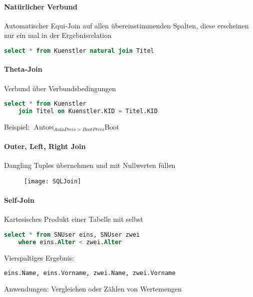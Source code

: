 \paragraph{Natürlicher Verbund}
\begin{items}
	\item Automatischer Equi-Join auf allen übereinstimmenden Spalten, diese erscheinen nur ein mal in der Ergebnisrelation
	\begin{lstlisting}[language=sql]
select * from Kuenstler natural join Titel
	\end{lstlisting}
\end{items}

\paragraph{Theta-Join}
\begin{items}
	\item Verbund über Verbundsbedingungen
	\begin{lstlisting}[language=sql]
select * from Kuenstler 
	join Titel on Kuenstler.KID = Titel.KID
	\end{lstlisting}
	\item Beispiel: \(  \text{Auto} \bowtie_{AutoPreis > BootPreis} \text{Boot} \)
\end{items}

\paragraph{Outer, Left, Right Join}
\begin{items}
	\item Dangling Tuples übernehmen und mit Nullwerten füllen
	\begin{figure}[H]\centering\label{SQLJoin}\texttt{[image: SQLJoin]}\end{figure}
\end{items}

\paragraph{Self-Join}
\begin{items}
	\item Kartesisches Produkt einer Tabelle mit selbst
	\begin{lstlisting}[language=sql] 
	select * from SNUser eins, SNUser zwei
	where eins.Alter < zwei.Alter
	\end{lstlisting}
	Vierspaltiges Ergebnis:
	\begin{lstlisting}[language=sql]
eins.Name, eins.Vorname, zwei.Name, zwei.Vorname
	\end{lstlisting}
	\item Anwendungen: Vergleichen oder Zählen von Wertemengen
\end{items}



